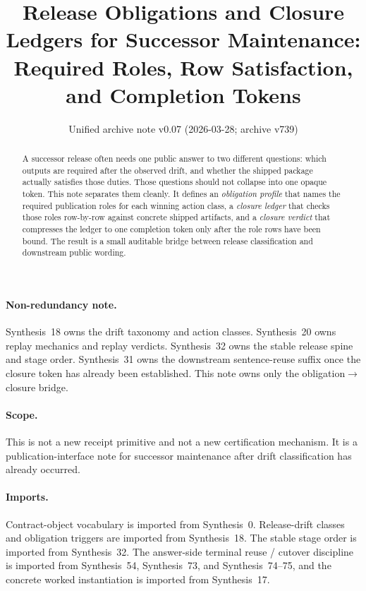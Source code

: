 \documentclass[11pt]{article}
\title{Release Obligations and Closure Ledgers for Successor Maintenance:\\[0.5ex]
\large Required Roles, Row Satisfaction, and Completion Tokens}
\author{}
\date{Unified archive note v0.07 (2026-03-28; archive v739)}
\begin{document}
\maketitle

\begin{abstract}
A successor release often needs one public answer to two different questions: which outputs are required after the observed drift, and whether the shipped package actually satisfies those duties.
Those questions should not collapse into one opaque token.
This note separates them cleanly.
It defines an \emph{obligation profile} that names the required publication roles for each winning action class, a \emph{closure ledger} that checks those roles row-by-row against concrete shipped artifacts, and a \emph{closure verdict} that compresses the ledger to one completion token only after the role rows have been bound.
The result is a small auditable bridge between release classification and downstream public wording.
\end{abstract}

\paragraph{Non-redundancy note.}
Synthesis~18 owns the drift taxonomy and action classes.\cite{series:planstateequiv}
Synthesis~20 owns replay mechanics and replay verdicts.\cite{series:auditorreplay}
Synthesis~32 owns the stable release spine and stage order.\cite{series:releasespine}
Synthesis~31 owns the downstream sentence-reuse suffix once the closure token has already been established.\cite{series:downstreamnormalforms}
This note owns only the obligation$\to$closure bridge.

\paragraph{Scope.}
This is not a new receipt primitive and not a new certification mechanism.
It is a publication-interface note for successor maintenance after drift classification has already occurred.

\paragraph{Imports.}
Contract-object vocabulary is imported from Synthesis~0.\cite{series:contractobjects}
Release-drift classes and obligation triggers are imported from Synthesis~18.\cite{series:planstateequiv}
The stable stage order is imported from Synthesis~32.\cite{series:releasespine}
The answer-side terminal reuse / cutover discipline is imported from Synthesis~54, Synthesis~73, and Synthesis~74--75, and the concrete worked instantiation is imported from Synthesis~17.\cite{series:challengeanswerreviewmenus,series:pairedterminalcitationdiscipline,series:pairedterminalcutoverrules,series:workedexample}
\end{document}
